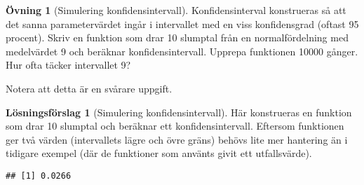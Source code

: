 \documentclass[
]{book}
\newenvironment{Shaded}{\begin{snugshade}}{\end{snugshade}}
\newcommand{\AttributeTok}[1]{\textcolor[rgb]{0.77,0.63,0.00}{#1}}
\newcommand{\CommentTok}[1]{\textcolor[rgb]{0.56,0.35,0.01}{\textit{#1}}}
\newcommand{\ControlFlowTok}[1]{\textcolor[rgb]{0.13,0.29,0.53}{\textbf{#1}}}
\newcommand{\DecValTok}[1]{\textcolor[rgb]{0.00,0.00,0.81}{#1}}
\newcommand{\FunctionTok}[1]{\textcolor[rgb]{0.00,0.00,0.00}{#1}}
\newcommand{\NormalTok}[1]{#1}
\newcommand{\OtherTok}[1]{\textcolor[rgb]{0.56,0.35,0.01}{#1}}
\newcommand{\SpecialCharTok}[1]{\textcolor[rgb]{0.00,0.00,0.00}{#1}}
\newcommand{\StringTok}[1]{\textcolor[rgb]{0.31,0.60,0.02}{#1}}
\theoremstyle{definition}
\theoremstyle{definition}
\theoremstyle{definition}
\newtheorem{exercise}{Övning}[chapter]
\theoremstyle{definition}
\newtheorem{hypothesis}{Lösningsförslag}[chapter]
\theoremstyle{remark}
\begin{document}
\begin{exercise}[Simulering konfidensintervall]
Konfidensinterval konstrueras så att det sanna parametervärdet ingår i intervallet med en viss konfidensgrad (oftast 95 procent). Skriv en funktion som drar 10 slumptal från en normalfördelning med medelvärdet 9 och beräknar konfidensintervall. Upprepa funktionen 10000 gånger. Hur ofta täcker intervallet 9?

Notera att detta är en svårare uppgift.
\end{exercise}

\begin{hypothesis}[Simulering konfidensintervall]
Här konstrueras en funktion som drar 10 slumptal och beräknar ett konfidensintervall. Eftersom funktionen ger två värden (intervallets lägre och övre gräns) behövs lite mer hantering än i tidigare exempel (där de funktioner som använts givit ett utfallsvärde).

\begin{Shaded}
\end{Shaded}

\begin{verbatim}
## [1] 0.0266
\end{verbatim}

\begin{Shaded}
\end{Shaded}


\end{hypothesis}
\end{document}
